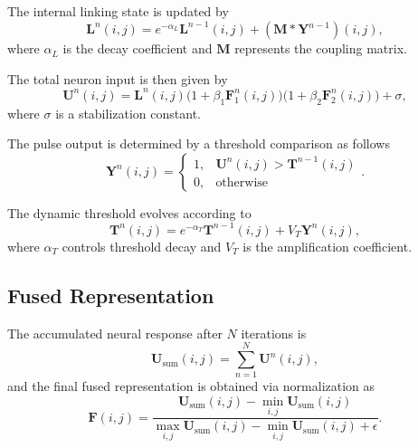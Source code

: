 \documentclass[anonymous]{iopjournal}
\begin{document}
The internal linking state is updated by
\begin{equation}
	\boldsymbol{L}^n(i,j) = e^{-\alpha_L} \boldsymbol{L}^{n-1}(i,j) + (\boldsymbol{M} * \boldsymbol{Y}^{n-1})(i,j),
	\label{eq:linking_update}
\end{equation}
where $\alpha_L$ is the decay coefficient and $\boldsymbol M$ represents the coupling matrix.

The total neuron input is then given by
\begin{equation}
	\boldsymbol{U}^n(i,j) = \boldsymbol{L}^n(i,j)\Big(1 + \beta_1 \boldsymbol{F}_1^n(i,j)\Big)
	\Big(1 + \beta_2 \boldsymbol{F}_2^n(i,j)\Big) + \sigma,
	\label{eq:internal_activity}
\end{equation}
where $\sigma$ is a stabilization constant.

The pulse output is determined by a threshold comparison as follows
\begin{equation}
	\boldsymbol{Y}^n(i,j) =
	\begin{cases}
		1, & \boldsymbol{U}^n(i,j) > \boldsymbol{T}^{n-1}(i,j) \\
		0, & \text{otherwise}
	\end{cases}.
	\label{eq:pulse_output}
\end{equation}

The dynamic threshold evolves according to
\begin{equation}
	\boldsymbol{T}^n(i,j) = e^{-\alpha_T} \boldsymbol{T}^{n-1}(i,j) + V_T \boldsymbol{Y}^n(i,j),
	\label{eq:threshold_update}
\end{equation}
where $\alpha_T$ controls threshold decay and $V_T$ is the amplification coefficient.

\subsection{Fused Representation}
The accumulated neural response after $N$ iterations is
\begin{equation}
	\boldsymbol{U}_{\mathrm{sum}}(i,j)=\sum_{n=1}^{N} \boldsymbol{U}^{n}(i,j),
\end{equation}
and the final fused representation is obtained via normalization as
\begin{equation}
	\boldsymbol{F}(i,j)=
	\frac{\boldsymbol{U}_{\mathrm{sum}}(i,j)-\min\limits_{i,j} \boldsymbol{U}_{\mathrm{sum}}(i,j)}
	{\max\limits_{i,j} \boldsymbol{U}_{\mathrm{sum}}(i,j)-\min\limits_{i,j} \boldsymbol{U}_{\mathrm{sum}}(i,j)+\epsilon}.
\end{equation}
\end{document}
